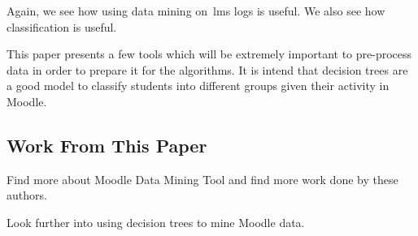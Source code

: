 Again, we see how using data mining on~\gls{lms} logs is useful. We also see
how classification is useful.

This paper presents a few tools which will be extremely important to
pre-process data in order to prepare it for the algorithms. It is intend that
decision trees are a good model to classify students into different groups
given their activity in Moodle.

\subsection{Work From This Paper}

Find more about Moodle Data Mining Tool and find more work done by these
authors.

Look further into using decision trees to mine Moodle data.
